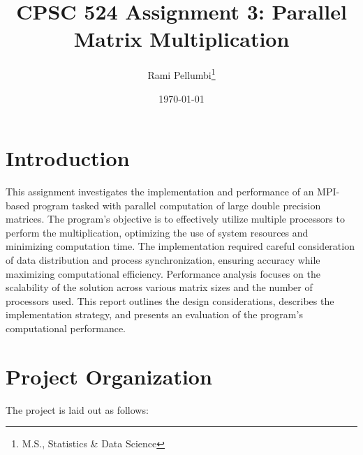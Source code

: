 \documentclass{article}
\title{CPSC 524 Assignment 3: Parallel Matrix Multiplication}
\author{Rami Pellumbi\thanks{M.S., Statistics \& Data Science}}
\date{\today}
\begin{document}
\maketitle

\newpage 

\section{Introduction}

This assignment investigates the implementation and performance of an MPI-
based program tasked with parallel computation of large double precision matrices.
The program's objective is to effectively utilize multiple processors to perform 
the multiplication, optimizing the use of system resources and minimizing 
computation time. The implementation required careful consideration of data 
distribution and process synchronization, ensuring accuracy while maximizing 
computational efficiency. Performance analysis focuses on the scalability of the solution across various 
matrix sizes and the number of processors used. This report outlines the design 
considerations, describes the implementation strategy, and presents an 
evaluation of the program's computational performance.

\section{Project Organization}

The project is laid out as follows:
\end{document}

